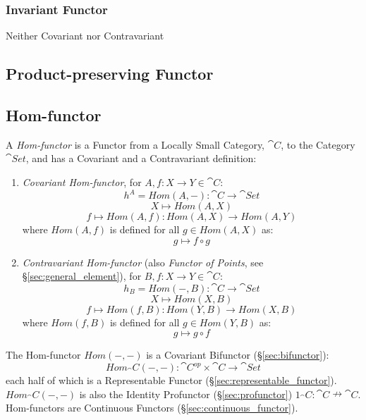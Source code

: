 \subsubsection{Invariant Functor} \label{sec:invariant_functor}

Neither Covariant nor Contravariant



\subsection{Product-preserving Functor}
\label{sec:product_preserving_functor}

\subsection{Hom-functor}\label{sec:hom_functor}

A \emph{Hom-functor} is a Functor from a Locally Small Category,
$\cat{C}$, to the Category $\cat{Set}$, and has a Covariant and
a Contravariant definition:

\begin{enumerate}
  \item \emph{Covariant Hom-functor}, for $A,f : X \rightarrow Y \in
    \cat{C}$:
\[
  h^A = Hom(A,-) : \cat{C} \rightarrow \cat{Set}
\]\[
  X \mapsto Hom(A,X)
\]\[
  f \mapsto Hom(A,f) : Hom(A,X) \rightarrow Hom(A,Y)
\]
  where $Hom(A,f)$ is defined for all $g \in Hom(A,X)$ as:
\[
  g \mapsto f \circ g
\]

  \item \emph{Contravariant Hom-functor} (also \emph{Functor of
    Points}, see \S\ref{sec:general_element}), for $B,f : X
    \rightarrow Y \in \cat{C}$:
\[
  h_B = Hom(-,B) : \cat{C} \rightarrow \cat{Set}
\]\[
  X \mapsto Hom(X,B)
\]\[
  f \mapsto Hom(f,B) : Hom(Y,B) \rightarrow Hom(X,B)
\]
  where $Hom(f,B)$ is defined for all $g \in Hom(Y,B)$ as:
\[
  g \mapsto g \circ f
\]
\end{enumerate}
The Hom-functor $Hom(-,-)$ is a Covariant Bifunctor
(\S\ref{sec:bifunctor}):
\[
  Hom_\cat{C}(-,-):
    \cat{C}^{op} \times \cat{C} \rightarrow \cat{Set}
\]
each half of which is a Representable Functor
(\S\ref{sec:representable_functor}). $Hom_\cat{C}(-,-)$ is also the
Identity Profunctor (\S\ref{sec:profunctor}) $1_\cat{C} :
\cat{C} \nrightarrow \cat{C}$. Hom-functors are Continuous
Functors (\S\ref{sec:continuous_functor}).


